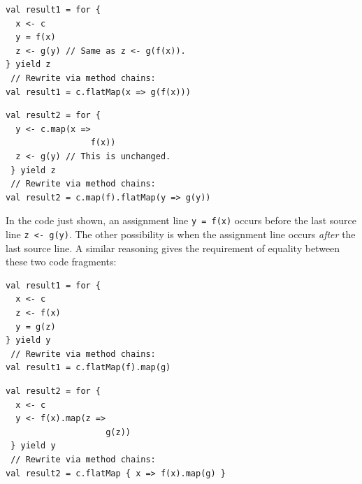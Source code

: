 \noindent \texttt{\textcolor{blue}{\footnotesize{}}}%
\begin{minipage}[c]{0.475\columnwidth}%
\begin{lstlisting}
val result1 = for {
  x <- c
  y = f(x)
  z <- g(y) // Same as z <- g(f(x)).
} yield z
 // Rewrite via method chains:
val result1 = c.flatMap(x => g(f(x)))
\end{lstlisting}
%
\end{minipage}\texttt{\textcolor{blue}{\footnotesize{}\hspace*{\fill}}}%
\begin{minipage}[c]{0.475\columnwidth}%
\begin{lstlisting}
val result2 = for {
  y <- c.map(x =>
                 f(x))
  z <- g(y) // This is unchanged.
 } yield z
 // Rewrite via method chains:
val result2 = c.map(f).flatMap(y => g(y))
\end{lstlisting}
%
\end{minipage}{\footnotesize\par}

\vspace{0\baselineskip}

In the code just shown, an assignment line \lstinline!y = f(x)! occurs
before the last source line \lstinline!z <- g(y)!. The other possibility
is when the assignment line occurs \emph{after} the last source line.
A similar reasoning gives the requirement of equality between these
two code fragments:

\vspace{0.3\baselineskip}

\noindent \texttt{\textcolor{blue}{\footnotesize{}}}%
\begin{minipage}[c]{0.475\columnwidth}%
\begin{lstlisting}
val result1 = for {
  x <- c
  z <- f(x)
  y = g(z)
} yield y
 // Rewrite via method chains:
val result1 = c.flatMap(f).map(g)
\end{lstlisting}
%
\end{minipage}\texttt{\textcolor{blue}{\footnotesize{}\hspace*{\fill}}}%
\begin{minipage}[c]{0.475\columnwidth}%
\begin{lstlisting}
val result2 = for {
  x <- c
  y <- f(x).map(z =>
                    g(z))
 } yield y
 // Rewrite via method chains:
val result2 = c.flatMap { x => f(x).map(g) }
\end{lstlisting}
%
\end{minipage}\vspace{0\baselineskip}

